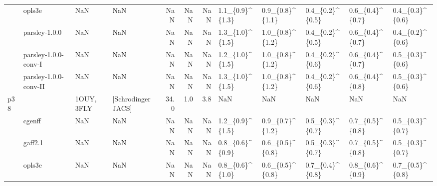 \begin{tabular}{llllrrrlllll}
     & opls3e &         NaN &                 NaN &         NaN &      NaN &            NaN &  1.1\_\{0.9\}\textasciicircum \{1.3\} &  0.9\_\{0.8\}\textasciicircum \{1.1\} &  0.4\_\{0.2\}\textasciicircum \{0.5\} &    0.6\_\{0.4\}\textasciicircum \{0.7\} &   0.4\_\{0.3\}\textasciicircum \{0.6\} \\
     & parsley-1.0.0 &         NaN &                 NaN &         NaN &      NaN &            NaN &  1.3\_\{1.0\}\textasciicircum \{1.5\} &  1.0\_\{0.8\}\textasciicircum \{1.2\} &  0.4\_\{0.2\}\textasciicircum \{0.5\} &    0.6\_\{0.4\}\textasciicircum \{0.7\} &   0.4\_\{0.2\}\textasciicircum \{0.6\} \\
     & parsley-1.0.0-conv-I &         NaN &                 NaN &         NaN &      NaN &            NaN &  1.2\_\{1.0\}\textasciicircum \{1.5\} &  1.0\_\{0.8\}\textasciicircum \{1.2\} &  0.4\_\{0.2\}\textasciicircum \{0.6\} &    0.6\_\{0.4\}\textasciicircum \{0.7\} &   0.5\_\{0.3\}\textasciicircum \{0.6\} \\
     & parsley-1.0.0-conv-II &         NaN &                 NaN &         NaN &      NaN &            NaN &  1.3\_\{1.0\}\textasciicircum \{1.5\} &  1.0\_\{0.8\}\textasciicircum \{1.2\} &  0.4\_\{0.2\}\textasciicircum \{0.6\} &    0.6\_\{0.4\}\textasciicircum \{0.8\} &   0.5\_\{0.3\}\textasciicircum \{0.6\} \\
p38 &                       &  1OUY, 3FLY &  [Schrodinger JACS] &        34.0 &      1.0 &            3.8 &              NaN &              NaN &              NaN &                NaN &               NaN \\
     & cgenff &         NaN &                 NaN &         NaN &      NaN &            NaN &  1.2\_\{0.9\}\textasciicircum \{1.5\} &  0.9\_\{0.7\}\textasciicircum \{1.2\} &  0.5\_\{0.3\}\textasciicircum \{0.7\} &    0.7\_\{0.5\}\textasciicircum \{0.8\} &   0.5\_\{0.3\}\textasciicircum \{0.7\} \\
     & gaff2.1 &         NaN &                 NaN &         NaN &      NaN &            NaN &  0.8\_\{0.6\}\textasciicircum \{0.9\} &  0.6\_\{0.5\}\textasciicircum \{0.8\} &  0.5\_\{0.3\}\textasciicircum \{0.7\} &    0.7\_\{0.5\}\textasciicircum \{0.8\} &   0.5\_\{0.3\}\textasciicircum \{0.7\} \\
     & opls3e &         NaN &                 NaN &         NaN &      NaN &            NaN &  0.8\_\{0.6\}\textasciicircum \{1.0\} &  0.6\_\{0.5\}\textasciicircum \{0.8\} &  0.7\_\{0.4\}\textasciicircum \{0.8\} &    0.8\_\{0.6\}\textasciicircum \{0.9\} &   0.7\_\{0.5\}\textasciicircum \{0.8\} \\

\end{tabular}
